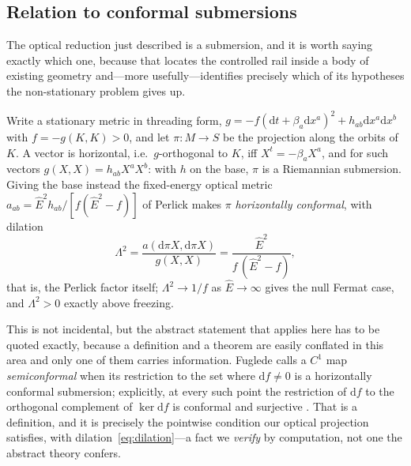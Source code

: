 \documentclass[12pt]{iopart}
\theoremstyle{plain}
\theoremstyle{definition}
\theoremstyle{remark}
\newcommand{\Ehat}{\hat E}
\newcommand{\dd}{\mathrm{d}}
\begin{document}
\subsection{Relation to conformal submersions}
\label{sec:submersion}
The optical reduction just described is a submersion, and it is worth saying
exactly which one, because that locates the controlled rail inside a body of
existing geometry and---more usefully---identifies precisely which of its
hypotheses the non-stationary problem gives up.

Write a stationary metric in threading form,
$g=-f(\dd t+\beta_a\dd x^a)^2+h_{ab}\dd x^a\dd x^b$ with $f=-g(K,K)>0$, and let
$\pi:M\to S$ be the projection along the orbits of $K$. A vector is horizontal,
i.e.\ $g$-orthogonal to $K$, iff $X^t=-\beta_aX^a$, and for such vectors
$g(X,X)=h_{ab}X^aX^b$: with $h$ on the base, $\pi$ is a Riemannian submersion.
Giving the base instead the fixed-energy optical metric
$a_{ab}=\Ehat^2h_{ab}/[f(\Ehat^2-f)]$ of Perlick \cite{Perlick1991} makes $\pi$
\emph{horizontally conformal}, with dilation
\begin{equation}
    \Lambda^2=\frac{a(\dd\pi X,\dd\pi X)}{g(X,X)}
      =\frac{\Ehat^2}{f\,(\Ehat^2-f)} ,
    \label{eq:dilation}
\end{equation}
that is, the Perlick factor itself; $\Lambda^2\to1/f$ as $\Ehat\to\infty$ gives
the null Fermat case, and $\Lambda^2>0$ exactly above freezing.

This is not incidental, but the abstract statement that applies here has to be
quoted exactly, because a definition and a theorem are easily conflated in this
area and only one of them carries information. Fuglede calls a $C^1$ map
\emph{semiconformal} when its restriction to the set where $\dd f\neq0$ is a
horizontally conformal submersion; explicitly, at every such point the restriction
of $\dd f$ to the orthogonal complement of $\ker\dd f$ is conformal and surjective
\cite[\S5]{Fuglede1978}. That is a definition, and it is precisely the pointwise
condition our optical projection satisfies, with dilation~\eqref{eq:dilation}---a
fact we \emph{verify} by computation, not one the abstract theory confers.
\end{document}
